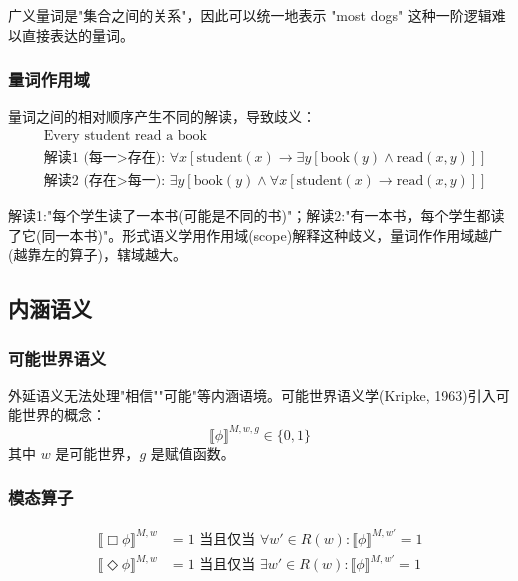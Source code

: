 广义量词是"集合之间的关系"，因此可以统一地表示 "most dogs" 这种一阶逻辑难以直接表达的量词。

\subsubsection{量词作用域}

量词之间的相对顺序产生不同的解读，导致歧义：
\begin{equation}
    \begin{aligned}
    &\text{Every student read a book} \\
    &\text{解读1 (每一>存在): } \forall x[\text{student}(x) \rightarrow \exists y[\text{book}(y) \land \text{read}(x,y)]] \\
    &\text{解读2 (存在>每一): } \exists y[\text{book}(y) \land \forall x[\text{student}(x) \rightarrow \text{read}(x,y)]]
    \end{aligned}
\end{equation}

解读1:"每个学生读了一本书(可能是不同的书)"；解读2:"有一本书，每个学生都读了它(同一本书)"。形式语义学用作用域(scope)解释这种歧义，量词作作用域越广(越靠左的算子)，辖域越大。

\subsection{内涵语义}

\subsubsection{可能世界语义}

外延语义无法处理"相信""可能"等内涵语境。可能世界语义学(Kripke, 1963)引入可能世界的概念：
\begin{equation}
    \llbracket \phi \rrbracket^{M,w,g} \in \{0, 1\}
\end{equation}
其中 $w$ 是可能世界，$g$ 是赋值函数。

\subsubsection{模态算子}

\begin{equation}
    \begin{aligned}
    \llbracket \Box \phi \rrbracket^{M,w} &= 1 \text{ 当且仅当 } \forall w' \in R(w): \llbracket \phi \rrbracket^{M,w'} = 1 \\
    \llbracket \Diamond \phi \rrbracket^{M,w} &= 1 \text{ 当且仅当 } \exists w' \in R(w): \llbracket \phi \rrbracket^{M,w'} = 1
    \end{aligned}
\end{equation}

